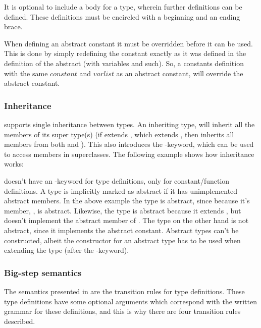 
It is optional to include a body for a type, wherein further definitions can be
defined. These definitions must be encircled with a beginning and an ending brace. 

When defining an abstract constant it must be overridden before it can be used.
This is done by simply redefining the constant exactly as it was defined in the
definition of the abstract (with variables and such). So, a constants definition
with the same $constant$ and $varlist$ as an abstract constant, will override
the abstract constant.

\subsubsection{Inheritance}


\productname{} supports single inheritance between types. An inheriting type, will
inherit all the members of its super type(s) (if  extends , which
extends , then  inherits all members from both  and ).
This also introduces the -keyword, which can be used to access members
in superclasses. The following example shows how inheritance works:


\productname{} doesn't have an -keyword for type definitions, only
for constant/function definitions. A type is implicitly marked as abstract if it has
unimplemented abstract members. In the above example the type  is abstract,
since because it's member, , is abstract. Likewise, the type
 is abstract because it extends , but doesn't implement the abstract
member of . The type  on the other hand is not abstract, since it
implements the abstract constant. Abstract types can't be constructed, albeit the
constructor for an abstract type has to be used when extending the type (after the
-keyword).


\subsubsection{Big-step semantics}

The semantics presented in  are the transition rules for type definitions.
These type definitions have some optional arguments which correspond with the
written grammar for these definitions, and this is why there are four transition
rules described.

